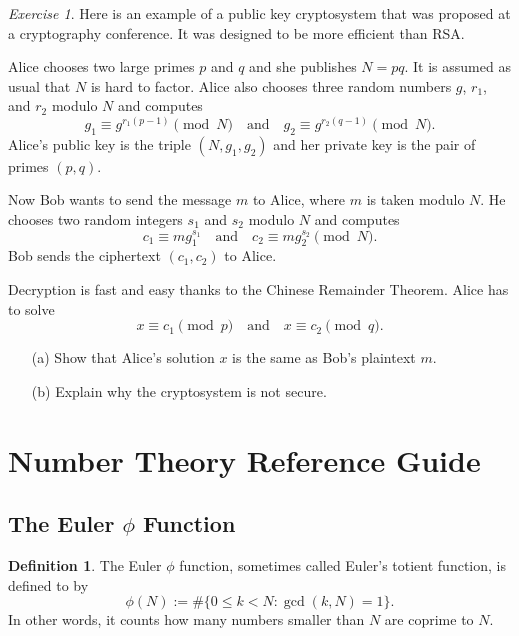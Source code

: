 \documentclass{article}
\theoremstyle{definition}
\newtheorem{definition}{Definition}%
\theoremstyle{remark}
\newtheorem{exercise}{Exercise}
\begin{document}
    \begin{exercise}
        Here is an example of a public key cryptosystem that was proposed at a cryptography conference.
        It was designed to be more efficient than RSA.

        Alice chooses two large primes \(p\) and \(q\) and she publishes \(N=pq\).
        It is assumed as usual that \(N\) is hard to factor.
        Alice also chooses three random numbers \(g\), \(r_1\), and \(r_2\) modulo \(N\) and computes 
        \[g_1 \equiv g^{r_1(p-1)}\pmod{N}\quad\textrm{and}\quad g_2 \equiv g^{r_2(q-1)}\pmod{N}.\]
        Alice's public key is the triple \((N,g_1,g_2)\) and her private key is the pair of primes \((p,q)\).

        Now Bob wants to send the message \(m\) to Alice, where \(m\) is taken modulo \(N\).
        He chooses two random integers \(s_1\) and \(s_2\) modulo \(N\) and computes
        \[c_1 \equiv mg_1^{s_1}\quad\textrm{and}\quad c_2 \equiv mg_2^{s_2}\pmod{N}.\]
        Bob sends the ciphertext \((c_1,c_2)\) to Alice.

        Decryption is fast and easy thanks to the Chinese Remainder Theorem.
        Alice has to solve
        \[x\equiv c_1\pmod{p}\quad\textrm{and}\quad x\equiv c_2\pmod{q}.\]

        \begin{enumerate}
            \item[(a)] Show that Alice's solution \(x\) is the same as Bob's plaintext \(m\).
            \item[(b)] Explain why the cryptosystem is not secure. 
        \end{enumerate}
    \end{exercise}

\section{Number Theory Reference Guide}

    \subsection{The Euler \(\phi\) Function}

        \begin{definition}
            The Euler \(\phi\) function, sometimes called Euler's totient function, is defined to by
            \[\phi(N) := \#\{0\leq k<N : \gcd(k,N) = 1\}.\]
            In other words, it counts how many numbers smaller than \(N\) are coprime to \(N\).
        \end{definition}
\end{document}
